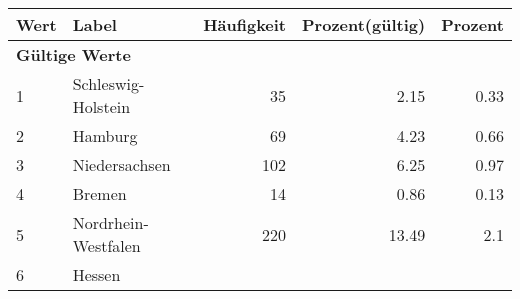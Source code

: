      \begin{longtable}{lXrrr}
     \toprule
     \textbf{Wert} & \textbf{Label} & \textbf{Häufigkeit} & \textbf{Prozent(gültig)} & \textbf{Prozent} \\
     \endhead
     \midrule
     \multicolumn{5}{l}{\textbf{Gültige Werte}}\\

     1 &
     \multicolumn{1}{X}{ Schleswig-Holstein   } &


       \num{35} &
       \num[round-mode=places,round-precision=2]{2,15} &
         \num[round-mode=places,round-precision=2]{0,33} \\

     2 &
     \multicolumn{1}{X}{ Hamburg   } &


       \num{69} &
       \num[round-mode=places,round-precision=2]{4,23} &
         \num[round-mode=places,round-precision=2]{0,66} \\

     3 &
     \multicolumn{1}{X}{ Niedersachsen   } &


       \num{102} &
       \num[round-mode=places,round-precision=2]{6,25} &
         \num[round-mode=places,round-precision=2]{0,97} \\

     4 &
     \multicolumn{1}{X}{ Bremen   } &


       \num{14} &
       \num[round-mode=places,round-precision=2]{0,86} &
         \num[round-mode=places,round-precision=2]{0,13} \\

     5 &
     \multicolumn{1}{X}{ Nordrhein-Westfalen   } &


       \num{220} &
       \num[round-mode=places,round-precision=2]{13,49} &
         \num[round-mode=places,round-precision=2]{2,1} \\

     6 &
     \multicolumn{1}{X}{ Hessen   } &



\end{longtable}
